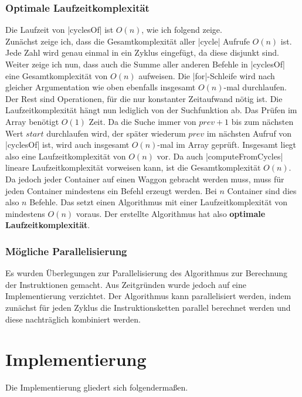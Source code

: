 \subsubsection{Optimale Laufzeitkomplexität}
Die Laufzeit von |cyclesOf| ist $O(n)$, wie ich folgend zeige.\\
Zunächst zeige ich, dass die Gesamtkomplexität aller |cycle| Aufrufe $O(n)$ ist.
Jede Zahl wird genau einmal in ein Zyklus eingefügt, da diese disjunkt sind.
Weiter zeige ich nun, dass auch die Summe aller anderen Befehle in |cyclesOf| eine Gesamtkomplexität von $O(n)$ aufweisen.
Die |for|-Schleife wird nach gleicher Argumentation wie oben ebenfalls insgesamt $O(n)$-mal durchlaufen.
Der Rest sind Operationen, für die nur konstanter Zeitaufwand nötig ist. Die Laufzeitkomplexität hängt nun lediglich von der Suchfunktion ab.
Das Prüfen im Array benötigt $O(1)$ Zeit. Da die Suche immer von $prev+1$ bis zum nächsten Wert $start$ durchlaufen wird, der später wiederum $prev$ im nächsten Aufruf von |cyclesOf| ist,
wird auch insgesamt $O(n)$-mal im Array geprüft. Insgesamt liegt also eine Laufzeitkomplexität von $O(n)$ vor.
Da auch |computeFromCycles| lineare Laufzeitkomplexität vorweisen kann, ist die Gesamtkomplexität $O(n)$.\\

Da jedoch jeder Container auf einen Waggon gebracht werden muss, muss für jeden Container mindestens ein Befehl erzeugt werden.
Bei $n$ Container sind dies also $n$ Befehle. Das setzt einen Algorithmus mit einer Laufzeitkomplexität von mindestens $O(n)$ voraus.
Der erstellte Algorithmus hat also \textbf{optimale Laufzeitkomplexität}.

\subsubsection{Mögliche Parallelisierung}
Es wurden Überlegungen zur Parallelisierung des Algorithmus zur Berechnung der Instruktionen gemacht.
Aus Zeitgründen wurde jedoch auf eine Implementierung verzichtet.
Der Algorithmus kann pa\-ral\-le\-li\-siert werden,
indem zunächst für jeden Zyklus die Instruktionsketten parallel berechnet werden und diese nachträglich kombiniert werden.
\clearpage

\section{Implementierung}
Die Implementierung gliedert sich folgendermaßen. \\

